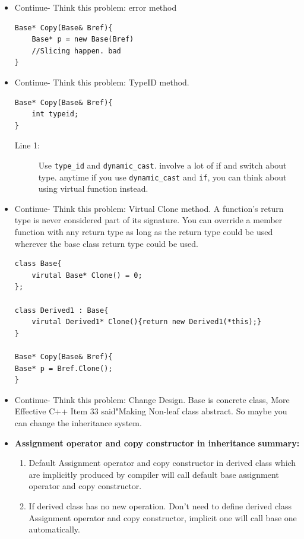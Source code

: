 \documentclass[a4paper,11pt,twoside]{book}
\begin{document}
\begin{itemize}
\item Continue- Think this problem: error method
\begin{lstlisting}[numbers=none]
Base* Copy(Base& Bref){
	Base* p = new Base(Bref)
	//Slicing happen. bad
}
\end{lstlisting}
	\item Continue- Think this problem: TypeID method.
\begin{lstlisting}[numbers=none]
Base* Copy(Base& Bref){
	int typeid;
}
\end{lstlisting}
\begin{description}
	\item[Line 1:] Use \texttt{type\_id} and \texttt{dynamic\_cast}. involve a lot of if and switch about type. anytime if you use \texttt{dynamic\_cast} and \texttt{if}, you can think about using virtual function instead.
\end{description}
	
\item Continue- Think this problem: Virtual Clone method.
	A function's return type is never considered part of its signature. You can override a member function with any return type as long as the return type could be used wherever the base class return type could be used.
\begin{lstlisting}[numbers=none]
class Base{
	virutal Base* Clone() = 0;
};
	
class Derived1 : Base{
	virutal Derived1* Clone(){return new Derived1(*this);}
}
	
Base* Copy(Base& Bref){
Base* p = Bref.Clone();
}
\end{lstlisting}
	
	\item Continue- Think this problem: Change Design. Base is concrete class,  More Effective C++ Item 33 said"Making Non-leaf class abstract. So maybe you can change the inheritance system.
	
	\item \textbf{Assignment operator and copy constructor in inheritance summary:}

	\begin{enumerate}
		\item Default Assignment  operator and  copy constructor in derived class which are implicitly produced by compiler will call default base assignment operator and  copy constructor.
		
		\item If derived class has no new operation. Don't need to define derived class Assignment  operator and  copy constructor, implicit one will call base one automatically.
		

\end{enumerate}
\end{itemize}
\end{document}
